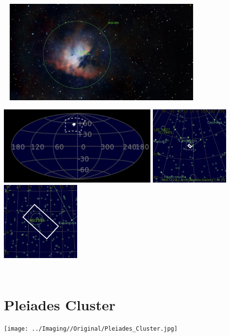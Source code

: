 \begin{center}
 \ \newpage
\includegraphics[width=0.75\textwidth]{../Imaging//Annotated/Pacman_Nebula_Annotated.jpg}

\includegraphics[height=4cm]{../Imaging//Annotated/Pacman_Nebula_Globe.jpg}
\includegraphics[height=4cm]{../Imaging//Annotated/Pacman_Nebula_Close.jpg}
\includegraphics[height=4cm]{../Imaging//Annotated/Pacman_Nebula_Closer.jpg}
\end{center}
\ \\\section{Pleiades Cluster}
\texttt{[image: ../Imaging//Original/Pleiades\_Cluster.jpg]}
